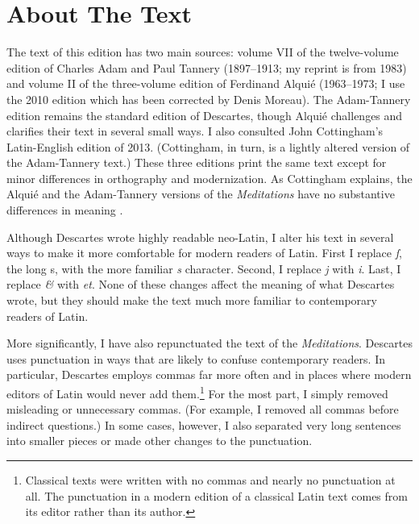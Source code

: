 \section{About The Text}

The text of this edition has two main sources: volume VII of the twelve-volume edition of Charles Adam and Paul Tannery (1897--1913; my reprint is from 1983) and volume II of the three-volume edition of Ferdinand Alquié (1963--1973; I use the 2010 edition which has been corrected by Denis Moreau). The Adam-Tannery edition remains the standard edition of Descartes, though Alquié challenges and clarifies their text in several small ways. I also consulted John Cottingham's Latin-English edition of 2013. (Cottingham, in turn, is a lightly altered version of the Adam-Tannery text.) These three editions print the same text except for minor differences in orthography and modernization. As Cottingham explains, the Alquié and the Adam-Tannery versions of the \textit{Meditations} have no substantive differences in meaning \parencite[xxxii, footnote 5]{cottingham2013}.

Although Descartes wrote highly readable neo-Latin, I alter his text in several ways to make it more comfortable for modern readers of Latin. First I replace  \textit{ſ}, the long s, with the more familiar \textit{s} character. Second, I replace \textit{j} with \textit{i}. Last, I replace \textit{\&} with \textit{et}. None of these changes affect the meaning of what Descartes wrote, but they should make the text much more familiar to contemporary readers of Latin.

More significantly, I have also repunctuated the text of the \textit{Meditations}. Descartes uses punctuation in ways that are likely to confuse contemporary readers. In particular, Descartes employs commas far more often and in places where modern editors of Latin would never add them.\footnote{Classical texts were written with no commas and nearly no punctuation at all. The punctuation in a modern edition of a classical Latin text comes from its editor rather than its author.} For the most part, I simply removed misleading or unnecessary commas. (For example, I removed all commas before indirect questions.) In some cases, however, I also separated very long sentences into smaller pieces or made other changes to the punctuation.


